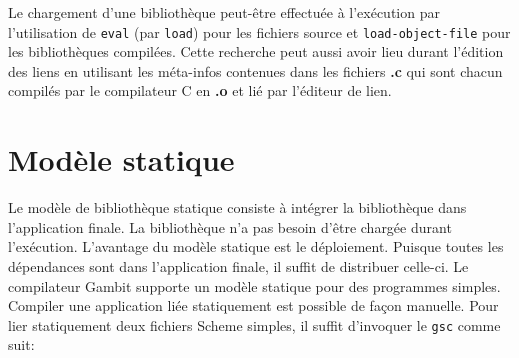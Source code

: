 Le chargement d'une bibliothèque peut-être effectuée à l'exécution par
l'utilisation de \texttt{eval} (par \texttt{load}) pour les fichiers source et
\texttt{load-object-file} pour les bibliothèques compilées. Cette recherche
peut aussi avoir lieu durant l'édition des liens en utilisant les méta-infos
contenues dans les fichiers \textbf{.c} qui sont chacun compilés par le compilateur C
en \textbf{.o} et lié par l'éditeur de lien.

\section{Modèle statique}

Le modèle de bibliothèque statique consiste à intégrer la bibliothèque
dans l'application finale. La bibliothèque n'a pas besoin d'être chargée
durant l'exécution. L'avantage du modèle statique est le déploiement.
Puisque toutes les dépendances sont dans l'application finale, il suffit
de distribuer celle-ci. Le compilateur Gambit supporte un modèle statique
pour des programmes simples. Compiler une application liée statiquement est
possible de façon manuelle. Pour lier statiquement deux fichiers Scheme
simples, il suffit d'invoquer le \texttt{gsc} comme suit:

\begin{center}
\end{center}


